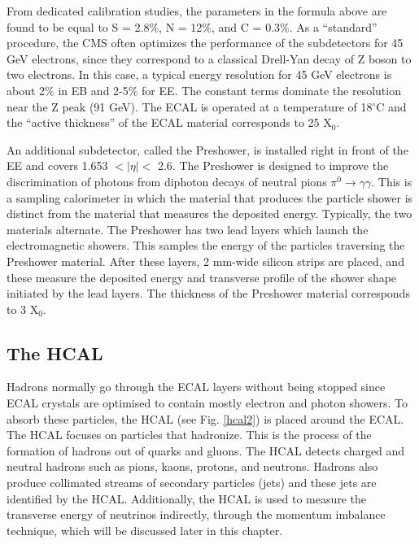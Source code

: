 \begin{normalsize}
From dedicated calibration studies, the parameters in the formula above are found to be equal to S = 2.8$\%$, N = 12$\%$, and C = 0.3$\%$. As a ``standard'' procedure, the CMS often optimizes the performance of the subdetectors for 45 GeV electrons, since they correspond to a classical Drell-Yan decay of Z boson to two electrons. In this case, a typical energy resolution for 45 GeV electrons is about 2$\%$ in EB and 2-5$\%$ for EE. The constant terms dominate the resolution near the Z peak (91 GeV). The ECAL is operated at a temperature of 18$^{\circ}$C and the ``active thickness'' of the ECAL material corresponds to 25 X$_0$. 

An additional subdetector, called the Preshower, is installed right in front of the EE and covers 1.653 $ < | \eta |  < $ 2.6. The Preshower is designed to improve the discrimination of photons from diphoton decays of neutral pions $\pi^0 \rightarrow \gamma \gamma$. This is a sampling calorimeter in which the material that produces the particle shower is distinct from the material that measures the deposited energy. Typically, the two materials alternate. The Preshower has two lead layers which launch the electromagnetic showers. This samples the energy of the particles traversing the Preshower material.  After these layers, 2 mm-wide silicon strips are placed, and these measure the deposited energy and transverse profile of the shower shape initiated by the lead layers. The thickness of the Preshower material corresponds to 3 X$_0$.




\subsection{The HCAL}

Hadrons normally go through the ECAL layers without being stopped since ECAL crystals are optimised to contain mostly electron and photon showers. To absorb these particles, the HCAL \cite{HCAL_TDR} (see Fig. \ref{hcal2}) is placed around the ECAL. The HCAL focuses on particles that hadronize. This is the process of the formation of hadrons out of quarks and gluons. The HCAL detects charged and neutral hadrons such as pions, kaons, protons, and neutrons. Hadrons also produce collimated streams of secondary particles (jets) and these jets are identified by the HCAL. Additionally, the HCAL is used to measure the transverse energy of neutrinos indirectly, through the momentum imbalance technique, which will be discussed later in this chapter. 


\end{normalsize}
